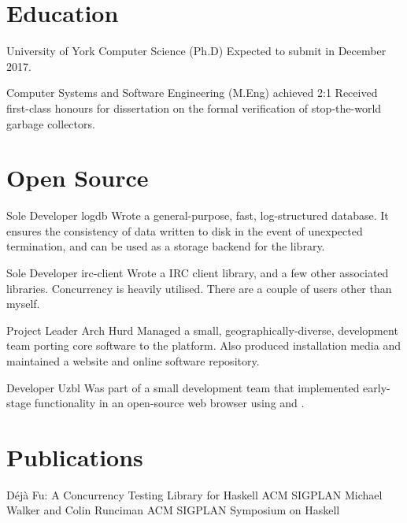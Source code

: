 \documentclass[a4paper]{barrucadu-cv}
\begin{document}
\section{Education}

\begin{educated}{University of York}
  {Computer Science (Ph.D)}
  {}
  {Expected to submit in December 2017.}

  {Computer Systems and Software Engineering (M.Eng)}
  {achieved 2:1}
  {Received first-class honours for dissertation on the formal
    verification of stop-the-world garbage collectors.}
\end{educated}

\section{Open Source}

  {Sole Developer}
  {logdb}
  {}
  {Wrote a  general-purpose, fast, log-structured
    database. It ensures the consistency of data written to disk in
    the event of unexpected termination, and can be used as a storage
    backend for the  library.}

  {Sole Developer}
  {irc-client}
  {}
  {Wrote a  IRC client library, and a few other
    associated libraries. Concurrency is heavily utilised. There are a
    couple of users other than myself.}

  {Project Leader}
  {Arch Hurd}
  {}
  {Managed a small, geographically-diverse, development team porting
    core  software to the  platform.
    Also produced installation media and maintained a website and
    online software repository.}

  {Developer}
  {Uzbl}
  {}
  {Was part of a small development team that implemented early-stage
    functionality in an open-source web browser using  and
    .}

\section{Publications}

  {Déjà Fu: A Concurrency Testing Library for Haskell}
  {ACM SIGPLAN}
  {Michael Walker and Colin Runciman}
  {ACM SIGPLAN Symposium on Haskell}
\end{document}
